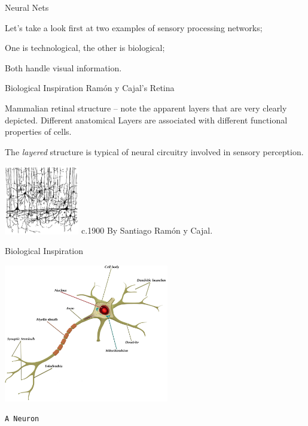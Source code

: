 \documentclass[12pt,t]{beamer}
\begin{document}
\begin{frame}{Neural Nets}

Let's take a look first at two examples of sensory processing networks; \pause

One is technological, the other is biological; \pause

Both handle visual information. \pause

\end{frame}

\begin{frame}{Biological Inspiration}
Ramón y Cajal’s Retina

  
Mammalian retinal structure –  note the apparent layers that are very clearly depicted.  Different anatomical Layers are associated with different functional properties of cells.  

The \textit{layered} structure is typical of neural circuitry involved in sensory perception.  


\includegraphics[height=30mm]{Figs/ramonycajal.pdf}
c.1900 By Santiago Ramón y Cajal.  
 
\end{frame}

\begin{frame}[c]{Biological Inspiration}

\includegraphics[height=60mm]{Figs/complete_neuron.pdf}

\hfill
{\footnotesize \lolit
{\tt A Neuron}
}

\end{frame}
\end{document}
